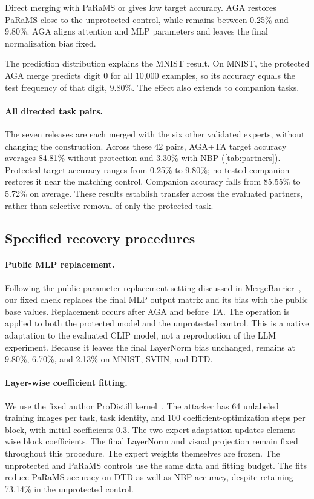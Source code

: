 Direct merging with PaRaMS or \method{} gives low target accuracy. AGA restores PaRaMS close to the unprotected control, while \method{} remains between 0.25\% and 9.80\%. AGA aligns attention and MLP parameters and leaves the final normalization bias fixed.

The prediction distribution explains the MNIST result. On MNIST, the protected AGA merge predicts digit 0 for all 10,000 examples, so its accuracy equals the test frequency of that digit, 9.80\%. The effect also extends to companion tasks.


\paragraph{All directed task pairs.}
The seven releases are each merged with the six other validated experts, without changing the construction. Across these 42 pairs, AGA+TA target accuracy averages 84.81\% without protection and 3.30\% with NBP (\cref{tab:partners}). Protected-target accuracy ranges from 0.25\% to 9.80\%; no tested companion restores it near the matching control. Companion accuracy falls from 85.55\% to 5.72\% on average. These results establish transfer across the evaluated partners, rather than selective removal of only the protected task.


\subsection{Specified recovery procedures}

\paragraph{Public MLP replacement.}
Following the public-parameter replacement setting discussed in MergeBarrier~\cite{li2025mergebarrier}, our fixed check replaces the final MLP output matrix and its bias with the public base values. Replacement occurs after AGA and before TA. The operation is applied to both the protected model and the unprotected control. This is a native adaptation to the evaluated CLIP model, not a reproduction of the LLM experiment. Because it leaves the final LayerNorm bias unchanged, \method{} remains at 9.80\%, 6.70\%, and 2.13\% on MNIST, SVHN, and DTD.

\paragraph{Layer-wise coefficient fitting.}
We use the fixed author ProDistill kernel~\cite{xu2025prodistill}. The attacker has 64 unlabeled training images per task, task identity, and 100 coefficient-optimization steps per block, with initial coefficients 0.3. The two-expert adaptation updates element-wise block coefficients. The final LayerNorm and visual projection remain fixed throughout this procedure. The expert weights themselves are frozen. The unprotected and PaRaMS controls use the same data and fitting budget. The fits reduce PaRaMS accuracy on DTD as well as NBP accuracy, despite retaining 73.14\% in the unprotected control.

